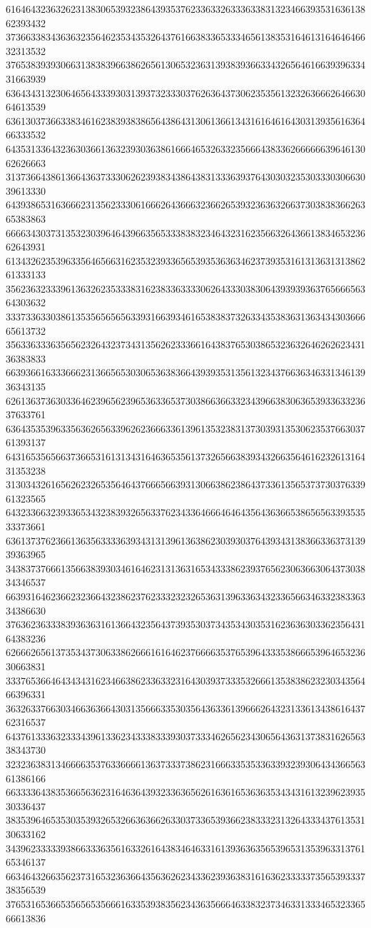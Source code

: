 61646432363262313830653932386439353762336332633363383132346639353163613862393432
37366338343636323564623534353264376166383365333465613835316461316464646632313532
37653839393066313838396638626561306532363139383936633432656461663939633431663939
63643431323064656433393031393732333037626364373062353561323263666264663064613539
63613037366338346162383938386564386431306136613431616461643031393561636466333532
64353133643236303661363239303638616664653263323566643833626666663964613062626663
31373664386136643637333062623938343864383133363937643030323530333030663039613330
64393865316366623135623330616662643666323662653932363632663730383836626365383863
66663430373135323039646439663565333838323464323162356632643661383465323662643931
61343262353963356465663162353239336565393536363462373935316131363131386261333133
35623632333961363262353338316238336333306264333038306439393936376566656364303632
33373363303861353565656563393166393461653838373263343538363136343430366665613732
35633633363565623264323734313562623336616438376530386532363264626262343136383833
66393661633366623136656530306536383664393935313561323437663634633134613936343135
62613637363033646239656239653633653730386636633234396638306365393363323637633761
63643535396335636265633962623666336139613532383137303931353062353766303761393137
64316535656637366531613134316463653561373265663839343266356461623261316431353238
31303432616562623265356464376665663931306638623864373361356537373037633961323565
64323366323933653432383932656337623433646664646435643636653865656339353533373661
63613737623661363563333639343131396136386230393037643934313836633637313939363965
34383737666135663839303461646231313631653433386239376562306366306437303834346537
66393164623662323664323862376233323232653631396336343233656634633238336334386630
37636236333839363631613664323564373935303734353430353162363630336235643164383236
62666265613735343730633862666161646237666635376539643335386665396465323630663831
33376536646434343162346638623363323164303937333532666135383862323034356466396331
36326337663034663636643031356663353035643633613966626432313361343861643762316537
64376133363233343961336234333833393037333462656234306564363137383162656338343730
32323638313466663537633666613637333738623166633535336339323930643436656361386166
66333364383536656362316463643932336365626163616536363534343161323962393530336437
38353964653530353932653266363662633037336539366238333231326433343761353130633162
34396233333938663336356163326164383464633161393636356539653135396331376165346137
66346432663562373165323636643563626234336239363831616362333337356539333738356539
37653165366535656535666163353938356234363566646338323734633133346532336566613836
